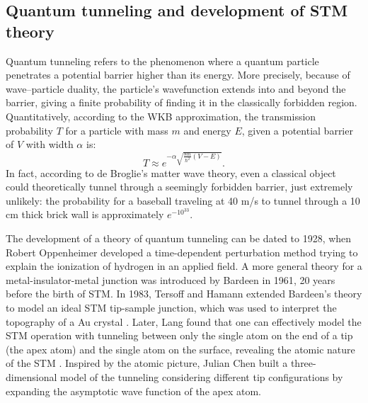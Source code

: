 \subsection{Quantum tunneling and development of STM theory}
Quantum tunneling refers to the phenomenon where a quantum particle penetrates a potential barrier higher than its energy. More precisely, because of wave–particle duality, the particle’s wavefunction extends into and beyond the barrier, giving a finite probability of finding it in the classically forbidden region. Quantitatively, according to the WKB approximation, the transmission probability $T$ for a particle with mass $m$ and energy $E$, given a potential barrier of $V$ with width $\alpha$ is: 
\begin{equation}
	T \approx e^{-\alpha\sqrt{\frac{8m}{\hslash^2}(V-E)}}. 
\end{equation}
In fact, according to de Broglie's  matter wave theory, even a classical object could theoretically tunnel through a seemingly forbidden barrier, just extremely unlikely: the probability for a baseball traveling at 40 m/s to tunnel through a 10 cm thick brick wall is approximately $e^{-10^{33}}$. 

The development of a theory of quantum tunneling can be dated to 1928, when Robert Oppenheimer developed a time-dependent perturbation method trying to explain the ionization of hydrogen in an applied field\cite{oppenheimerThreeNotesQuantum1928}. A more general theory for a metal-insulator-metal junction was introduced by Bardeen in 1961\cite{bardeenTunnellingManyParticlePoint1961}, 20 years before the birth of \ac{STM}. In 1983, Tersoff and Hamann extended Bardeen's theory to model an ideal STM tip-sample junction, which was used to interpret the topography of a Au crystal \cite{tersoffTheoryApplicationScanning1983,tersoffTheoryScanningTunneling1985}. Later, Lang found that one can effectively model the \ac{STM} operation with tunneling between only the single atom on the end of a tip (the apex atom) and the single atom on the surface, revealing the atomic nature of the \ac{STM} \cite{langVacuumTunnelingCurrent1985,langSpectroscopySingleAtoms1986,langApparentSizeAtom1987}. Inspired by the atomic picture, Julian Chen built a three-dimensional model of the tunneling considering different tip configurations by expanding the asymptotic wave function of the apex atom\cite{chenTunnelingMatrixElements1990,chenTheoryScanningTunneling1988}.  

